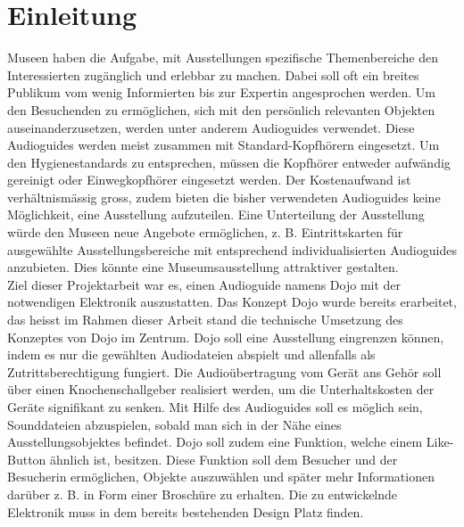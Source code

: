 \chapter{Einleitung}
\thispagestyle{fancy} 
Museen haben die Aufgabe, mit Ausstellungen spezifische Themenbereiche den Interessierten zugänglich und erlebbar zu machen. Dabei soll oft ein breites Publikum vom wenig Informierten bis zur Expertin angesprochen werden. Um den Besuchenden zu ermöglichen, sich mit den persönlich relevanten Objekten auseinanderzusetzen, werden unter anderem Audioguides verwendet. Diese Audioguides werden meist zusammen mit Standard-Kopfhörern eingesetzt. Um den Hygienestandards zu entsprechen, müssen die Kopfhörer entweder aufwändig gereinigt oder Einwegkopfhörer eingesetzt werden. Der Kostenaufwand ist verhältnismässig gross, zudem bieten die bisher verwendeten Audioguides keine Möglichkeit, eine Ausstellung aufzuteilen. Eine Unterteilung der Ausstellung würde den Museen neue Angebote ermöglichen, z. B. Eintrittskarten für ausgewählte Ausstellungsbereiche mit entsprechend individualisierten Audioguides anzubieten. Dies könnte eine Museumsausstellung attraktiver gestalten. \\

Ziel dieser Projektarbeit war es, einen Audioguide namens Dojo mit der notwendigen Elektronik auszustatten. Das Konzept Dojo wurde bereits erarbeitet, das heisst im Rahmen dieser Arbeit stand die technische Umsetzung des Konzeptes von Dojo im Zentrum. Dojo soll eine Ausstellung eingrenzen können, indem es nur die gewählten Audiodateien abspielt und allenfalls als Zutrittsberechtigung fungiert.  Die Audioübertragung vom Gerät ans Gehör soll über einen Knochenschallgeber realisiert werden, um die Unterhaltskosten der Geräte signifikant zu senken. Mit Hilfe des Audioguides soll es möglich sein, Sounddateien abzuspielen, sobald man sich in der Nähe eines Ausstellungsobjektes befindet. Dojo soll zudem eine Funktion, welche einem Like-Button ähnlich ist, besitzen. Diese Funktion soll dem Besucher und der Besucherin ermöglichen, Objekte auszuwählen und später mehr Informationen darüber z. B. in Form einer Broschüre zu erhalten. Die zu entwickelnde Elektronik muss in dem bereits bestehenden Design Platz finden. \\

